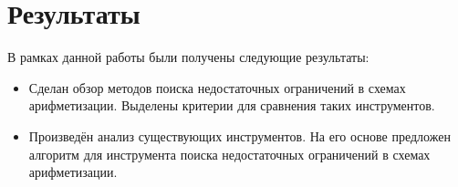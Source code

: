 \documentclass[a4paper]{article}
\begin{document}
\newpage
\section{Результаты}
\indent

В рамках данной работы были получены следующие результаты:
\begin{itemize}
    \item Сделан обзор методов поиска недостаточных ограничений в схемах арифметизации. Выделены критерии для сравнения таких инструментов.
    \item Произведён анализ существующих инструментов. На его основе предложен алгоритм для инструмента поиска недостаточных ограничений в схемах арифметизации.
\end{itemize}

\newpage
\end{document}
